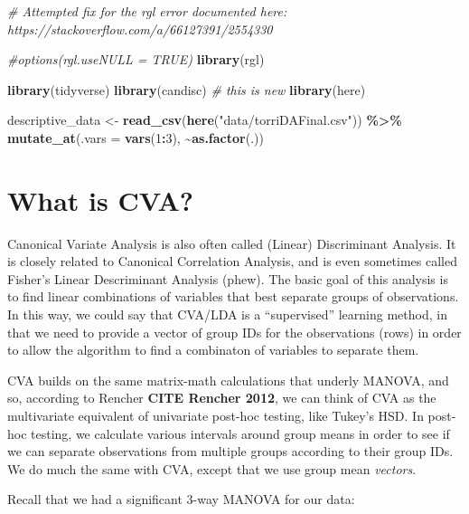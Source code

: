 \documentclass[
]{book}
\newenvironment{Shaded}{\begin{snugshade}}{\end{snugshade}}
\newcommand{\AttributeTok}[1]{\textcolor[rgb]{0.13,0.29,0.53}{#1}}
\newcommand{\CommentTok}[1]{\textcolor[rgb]{0.56,0.35,0.01}{\textit{#1}}}
\newcommand{\DecValTok}[1]{\textcolor[rgb]{0.00,0.00,0.81}{#1}}
\newcommand{\FunctionTok}[1]{\textcolor[rgb]{0.13,0.29,0.53}{\textbf{#1}}}
\newcommand{\NormalTok}[1]{#1}
\newcommand{\OtherTok}[1]{\textcolor[rgb]{0.56,0.35,0.01}{#1}}
\newcommand{\SpecialCharTok}[1]{\textcolor[rgb]{0.81,0.36,0.00}{\textbf{#1}}}
\newcommand{\StringTok}[1]{\textcolor[rgb]{0.31,0.60,0.02}{#1}}
\begin{document}
\begin{Shaded}
\begin{Highlighting}[]
\CommentTok{\# Attempted fix for the rgl error documented here: https://stackoverflow.com/a/66127391/2554330}

\CommentTok{\#options(rgl.useNULL = TRUE)}
\FunctionTok{library}\NormalTok{(rgl)}

\FunctionTok{library}\NormalTok{(tidyverse)}
\FunctionTok{library}\NormalTok{(candisc) }\CommentTok{\# this is new}
\FunctionTok{library}\NormalTok{(here)}

\NormalTok{descriptive\_data }\OtherTok{\textless{}{-}} \FunctionTok{read\_csv}\NormalTok{(}\FunctionTok{here}\NormalTok{(}\StringTok{"data/torriDAFinal.csv"}\NormalTok{)) }\SpecialCharTok{\%\textgreater{}\%}
  \FunctionTok{mutate\_at}\NormalTok{(}\AttributeTok{.vars =} \FunctionTok{vars}\NormalTok{(}\DecValTok{1}\SpecialCharTok{:}\DecValTok{3}\NormalTok{), }\SpecialCharTok{\textasciitilde{}}\FunctionTok{as.factor}\NormalTok{(.))}
\end{Highlighting}
\end{Shaded}

\section{What is CVA?}\label{what-is-cva}

Canonical Variate Analysis is also often called (Linear) Discriminant Analysis. It is closely related to Canonical Correlation Analysis, and is even sometimes called Fisher's Linear Descriminant Analysis (phew). The basic goal of this analysis is to find linear combinations of variables that best separate groups of observations. In this way, we could say that CVA/LDA is a ``supervised'' learning method, in that we need to provide a vector of group IDs for the observations (rows) in order to allow the algorithm to find a combinaton of variables to separate them.

CVA builds on the same matrix-math calculations that underly MANOVA, and so, according to Rencher \textbf{CITE Rencher 2012}, we can think of CVA as the multivariate equivalent of univariate post-hoc testing, like Tukey's HSD. In post-hoc testing, we calculate various intervals around group means in order to see if we can separate observations from multiple groups according to their group IDs. We do much the same with CVA, except that we use group mean \emph{vectors}.

Recall that we had a significant 3-way MANOVA for our data:
\end{document}
